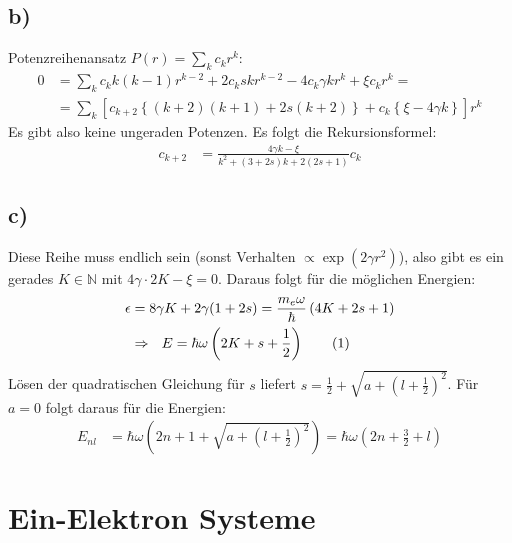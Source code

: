 \documentclass[a4paper,12pt]{article}
\newcommand\numberthis{\addtocounter{equation}{1}\tag{\theequation}}
\newcommand{\kla}{}
\newcommand{\klam}{}
\newcommand{\klammer}{}
\begin{document}
\subsection*{b)}
Potenzreihenansatz $P(r)=\sum_k c_kr^k$:
\begin{align*}
0&=\sum_kc_kk(k-1)r^{k-2}+2c_kskr^{k-2}-4c_k\gamma kr^k+\xi c_kr^k = \\
&=\sum_k\klam\left[ {c_{k+2}\klammer\left\{(k+2)(k+1)+2s(k+2) \right\}+c_k\klammer\left\{\xi -4\gamma k \right\}} \right]r^k 
\end{align*}    
Es gibt also keine ungeraden Potenzen. Es folgt die Rekursionsformel:
\begin{align*}
c_{k+2}&=\frac{4\gamma k-\xi}{k^2+(3+2s)k+2(2s+1)}c_k
\end{align*}
\subsection*{c)}
Diese Reihe muss endlich sein (sonst Verhalten $\propto\exp(2\gamma r^2)$), also gibt es ein gerades $K\in\mathbb{N}$ mit $4\gamma\cdot 2K-\xi=0$. Daraus folgt für die möglichen Energien:
\begin{align*}
\epsilon&=8\gamma K+2\gamma (1+2s)=\frac{m_e\omega}{\hbar}\kla\left( {4K+2s+1} \right)\\
&\Rightarrow\ \ E=\hbar\omega\kla\left( {2K+s+\frac{1}{2}} \right)\numberthis\label{Energien}
\end{align*}
Lösen der quadratischen Gleichung für $s$ liefert $s=\frac{1}{2}+\sqrt{a+\kla\left( {l+\frac{1}{2}} \right)^2}$. Für $a=0$ folgt daraus für die Energien:
\begin{align*}
E_{nl}&=\hbar\omega\kla\left( {2n+1+\sqrt{a+\kla\left( {l+\frac{1}{2}} \right)^2}} \right)=\hbar\omega\kla\left( {2n+\frac{3}{2}+l} \right)
\end{align*}
\section{Ein-Elektron Systeme}
\end{document}
